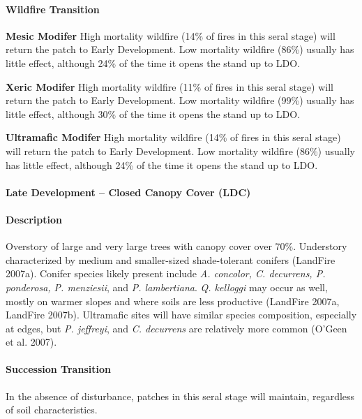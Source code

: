 \paragraph{Wildfire Transition}
\begin{adjustwidth}{2cm}{}
\textbf{Mesic Modifer } High mortality wildfire (14\% of fires in this seral stage) will return the patch to Early Development. Low mortality wildfire (86\%) usually has little effect, although 24\% of the time it opens the stand up to LDO. 

\textbf{Xeric Modifer} High mortality wildfire (11\% of fires in this seral stage) will return the patch to Early Development. Low mortality wildfire (99\%) usually has little effect, although 30\% of the time it opens the stand up to LDO. 

\textbf{Ultramafic Modifer} High mortality wildfire (14\% of fires in this seral stage) will return the patch to Early Development. Low mortality wildfire (86\%) usually has little effect, although 24\% of the time it opens the stand up to LDO. 

\end{adjustwidth}

\noindent\hrulefill

\paragraph{Late Development – Closed Canopy Cover (LDC)}

\paragraph{Description} Overstory of large and very large trees with canopy cover over 70\%. Understory characterized by medium and smaller-sized shade-tolerant conifers (LandFire 2007a). Conifer species likely present include \emph{A. concolor, C. decurrens, P. ponderosa, P. menziesii}, and \emph{P. lambertiana}. \emph{Q. kelloggi} may occur as well, mostly on warmer slopes and where soils are less productive (LandFire 2007a, LandFire 2007b). Ultramafic sites will have similar species composition, especially at edges, but \emph{P. jeffreyi}, and \emph{C. decurrens} are relatively more common (O’Geen et al. 2007).

\paragraph{Succession Transition} In the absence of disturbance, patches in this seral stage will maintain, regardless of soil characteristics.

